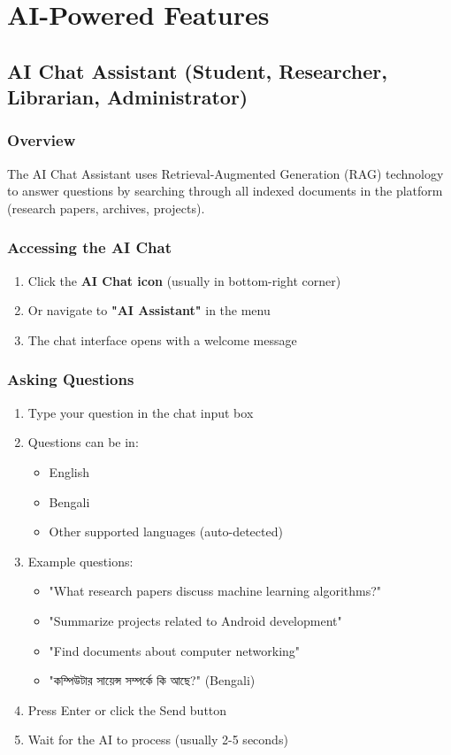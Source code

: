 \documentclass[12pt,a4paper]{article}
\begin{document}
\section{AI-Powered Features}

\subsection{AI Chat Assistant (Student, Researcher, Librarian, Administrator)}

\subsubsection{Overview}
The AI Chat Assistant uses Retrieval-Augmented Generation (RAG) technology to answer questions by searching through all indexed documents in the platform (research papers, archives, projects).

\subsubsection{Accessing the AI Chat}
\begin{enumerate}[leftmargin=*]
    \item Click the \textbf{AI Chat icon} (usually in bottom-right corner)
    \item Or navigate to \textbf{"AI Assistant"} in the menu
    \item The chat interface opens with a welcome message
\end{enumerate}

\subsubsection{Asking Questions}
\begin{enumerate}[leftmargin=*]
    \item Type your question in the chat input box
    \item Questions can be in:
        \begin{itemize}
            \item English
            \item Bengali
            \item Other supported languages (auto-detected)
        \end{itemize}
    \item Example questions:
        \begin{itemize}
            \item "What research papers discuss machine learning algorithms?"
            \item "Summarize projects related to Android development"
            \item "Find documents about computer networking"
            \item "কম্পিউটার সায়েন্স সম্পর্কে কি আছে?" (Bengali)
        \end{itemize}
    \item Press Enter or click the Send button
    \item Wait for the AI to process (usually 2-5 seconds)
\end{enumerate}
\end{document}
